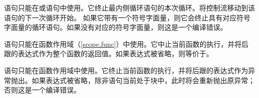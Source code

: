 \pnum
{}语句只能在或语句中使用。它终止最内侧循环语句的本次循环。将控制流移动到该语句的下一次循环开始。
如果它带有一个符号字面量，则它会终止具有对应符号字面量的循环语句。如果没有对应的符号字面量，则这是一个编译错误。

\pnum
{}语句只能在函数作用域（\ref{scope.func}）中使用。它中止当前函数的执行，并将后跟的表达式作为整个函数的返回值。如果表达式被省略，则等价于\tcode{()}。

\pnum
{}语句只能在函数作用域中使用。它终止当前函数的执行，并将后跟的表达式作为异常抛出。如果表达式被省略，除非语句当前处于块中，此时将会重新抛出原异常；否则这是一个编译错误。
